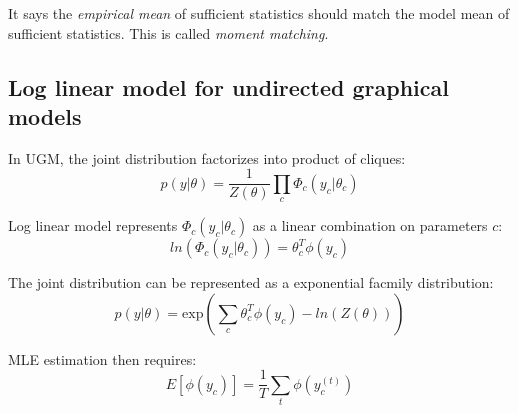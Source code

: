 \documentclass[11pts]{article}
\begin{document}
It says the \emph{empirical mean} of sufficient statistics should match the model mean of sufficient statistics. This is called \emph{moment matching}.

\subsection{Log linear model for undirected graphical models}
In UGM, the joint distribution factorizes into product of cliques:
\[
p(y|\theta) = \frac{1}{Z(\theta)} \prod_c \Phi_c(y_c|\theta_c)
\]

Log linear model represents $\Phi_c(y_c|\theta_c)$ as a linear combination on parameters $c$:
\[
ln(\Phi_c(y_c|\theta_c)) = \theta_c^T \phi(y_c)
\]

The joint distribution can be represented as a exponential facmily distribution:
\[
p(y|\theta) = \mathrm{exp}\left(\sum_c \theta_c^T \phi(y_c) - ln(Z(\theta))\right)
\]

MLE estimation then requires:
\[
E[\phi(y_c)] = \frac{1}{T} \sum_t \phi(y_c^{(t)})
\]
\end{document}
